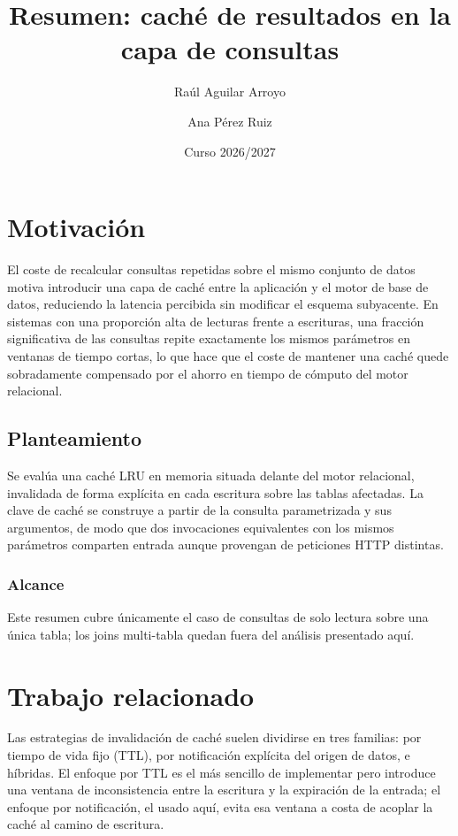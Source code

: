 \documentclass[10pt,twocolumn]{article}
\title{Resumen: caché de resultados en la capa de consultas}
\author{Raúl Aguilar Arroyo \and Ana Pérez Ruiz}
\date{Curso 2026/2027}
\begin{document}
\maketitle

\section{Motivación}

El coste de recalcular consultas repetidas sobre el mismo conjunto de datos
motiva introducir una capa de caché entre la aplicación y el motor de base
de datos, reduciendo la latencia percibida sin modificar el esquema
subyacente. En sistemas con una proporción alta de lecturas frente a
escrituras, una fracción significativa de las consultas repite exactamente
los mismos parámetros en ventanas de tiempo cortas, lo que hace que el
coste de mantener una caché quede sobradamente compensado por el ahorro en
tiempo de cómputo del motor relacional.

\subsection{Planteamiento}

Se evalúa una caché LRU en memoria situada delante del motor relacional,
invalidada de forma explícita en cada escritura sobre las tablas afectadas.
La clave de caché se construye a partir de la consulta parametrizada y sus
argumentos, de modo que dos invocaciones equivalentes con los mismos
parámetros comparten entrada aunque provengan de peticiones HTTP distintas.

\subsubsection{Alcance} Este resumen cubre únicamente el caso de consultas
de solo lectura sobre una única tabla; los joins multi-tabla quedan fuera
del análisis presentado aquí.

\section{Trabajo relacionado}

Las estrategias de invalidación de caché suelen dividirse en tres familias:
por tiempo de vida fijo (TTL), por notificación explícita del origen de
datos, e híbridas. El enfoque por TTL es el más sencillo de implementar
pero introduce una ventana de inconsistencia entre la escritura y la
expiración de la entrada; el enfoque por notificación, el usado aquí, evita
esa ventana a costa de acoplar la caché al camino de escritura.
\end{document}
